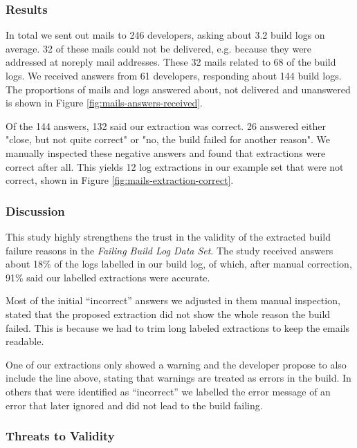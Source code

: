 \documentclass[\myrootdir/main.tex]{subfiles}
\begin{document}
\subsubsection{Results}
In total we sent out mails to 246 developers, asking about 3.2 build logs on average.
32 of these mails could not be delivered, e.g. because they were addressed at noreply mail addresses.
These 32 mails related to 68 of the build logs.
We received answers from 61 developers, responding about 144 build logs.
The proportions of mails and logs answered about, not delivered and unanswered is shown in Figure \ref{fig:mails-answers-received}.

Of the 144 answers, 132 said our extraction was correct.
26 answered either "close, but not quite correct" or "no, the build failed for another reason".
We manually inspected these negative answers and found that extractions were correct after all.
This yields 12 log extractions in our example set that were not correct, shown in Figure \ref{fig:mails-extraction-correct}.

\subsubsection{Discussion}
This study highly strengthens the trust in the validity of the extracted build failure reasons in the \emph{Failing Build Log Data Set}.
The study received answers about 18\% of the logs labelled in our build log, of which, after manual correction, 91\% said our labelled extractions were accurate.

Most of the initial ``incorrect'' answers we adjusted in them manual inspection, stated that the proposed extraction did not show the whole reason the build failed.
This is because we had to trim long labeled extractions to keep the emails readable.

One of our extractions only showed a warning and the developer propose to also include the line above, stating that warnings are treated as errors in the build.
In others that were identified as ``incorrect'' we labelled the error message of an error that later ignored and did not lead to the build failing.

\subsubsection{Threats to Validity}
\end{document}
